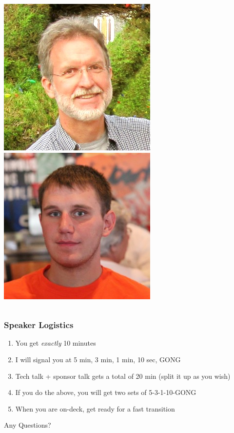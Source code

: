 \documentclass[xcolor=dvipsnames,red]{beamer}
\begin{document}
\begin{frame}
\begin{columns}
\begin{column}{.25\textwidth}
\includegraphics[width=.75\textwidth]{imgs/dan_williams.jpg}\\
\vspace{.2 cm}
\includegraphics[width=.75\textwidth]{imgs/justin_campbell.jpg}
\end{column}
\end{columns}

\end{frame}

\begin{frame}
\frametitle{Speaker Logistics}
\begin{enumerate}
\item You get {\em exactly} 10 minutes
\item I will signal you at 5 min, 3 min, 1 min, 10 sec, GONG
\item Tech talk + sponsor talk gets a total of 20 min (split it up as you wish)
\item If you do the above, you will get two sets of 5-3-1-10-GONG
\item When you are on-deck, get ready for a fast transition
\end{enumerate}

Any Questions?
\end{frame}
\end{document}
